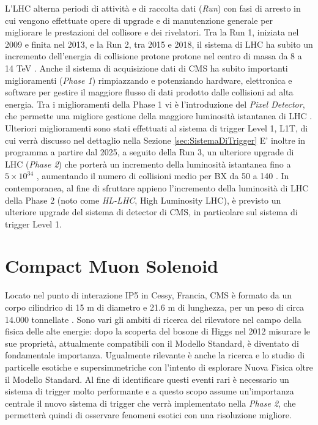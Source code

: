 L'LHC alterna periodi di attività e di raccolta dati (\textit{Run}) con fasi di arresto in cui vengono effettuate opere di upgrade e di manutenzione generale per migliorare le prestazioni del collisore e dei rivelatori. Tra la Run 1, iniziata nel 2009 e finita nel 2013, e la Run 2, tra 2015 e 2018, il sistema di LHC ha subito un incremento dell'energia di collisione protone protone nel centro di massa da 8 a 14 TeV \cite{sirunyan2020performance}. Anche il sistema di acquisizione dati di CMS ha subito importanti miglioramenti (\textit{Phase 1}) rimpiazzando e potenziando hardware, elettronica e software per gestire il maggiore flusso di dati prodotto dalle collisioni ad alta energia. Tra i miglioramenti della Phase 1 vi è l'introduzione del \textit{Pixel Detector}, che permette una migliore gestione della maggiore luminosità istantanea di LHC \cite{Adam:2748381}. Ulteriori miglioramenti sono stati effettuati al sistema di trigger Level 1, L1T, di cui verrà discusso nel dettaglio nella Sezione \ref{sec:SistemaDiTrigger} \newline 
E' inoltre in programma a partire dal 2025, a seguito della Run 3, un ulteriore upgrade di LHC (\textit{Phase 2}) che porterà un incremento della luminosità istantanea fino a $5\times 10^{34}$ \Lumi, aumentando il numero di collisioni medio per BX da 50 a 140 \cite{collaboration2021phase}. In contemporanea, al fine di sfruttare appieno l'incremento della luminosità di LHC della Phase 2 (noto come \textit{HL-LHC}, High Luminosity LHC), è previsto un ulteriore upgrade del sistema di detector di CMS, in particolare sul sistema di trigger Level 1.


\section{Compact Muon Solenoid}  
\label{sec:CMSDescrizione}

Locato nel punto di interazione IP5 in Cessy, Francia, CMS è formato da un corpo cilindrico di 15 m di diametro e 21.6 m di lunghezza, per un peso di circa 14.000 tonnellate \cite{cms2008cms}. Sono vari gli ambiti di ricerca del rilevatore nel campo della fisica delle alte energie: dopo la scoperta del bosone di Higgs nel 2012 misurare le sue proprietà, attualmente compatibili con il Modello Standard, è diventato di fondamentale importanza. Ugualmente rilevante è anche la ricerca e lo studio di particelle esotiche e supersimmetriche con l'intento di esplorare Nuova Fisica oltre il Modello Standard. Al fine di identificare questi eventi rari è necessario un sistema di trigger molto performante \cite{sirunyan2020performance} e a questo scopo assume un'importanza centrale il nuovo sistema di trigger che verrà implementato nella \textit{Phase 2}, che permetterà quindi di osservare fenomeni esotici con una risoluzione migliore.

